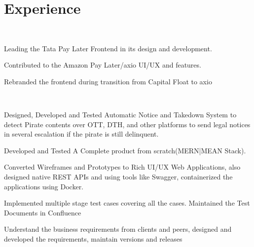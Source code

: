 \documentclass[]{deedy-resume-openfont}
\begin{document}
\hfill
\begin{minipage}[t]{0.66\textwidth} 


\section{Experience}

\sectionsep\\
\vspace{\topsep} %
\begin{tightemize}
\item Leading the Tata Pay Later Frontend in its design and development.
\item Contributed to the Amazon Pay Later/axio UI/UX and features.
\item Rebranded the frontend during transition from Capital Float to axio
\end{tightemize}
\sectionsep

\sectionsep\\
\vspace{\topsep} %
\begin{tightemize}
\item Designed, Developed and Tested Automatic Notice and Takedown System to detect Pirate contents over OTT, DTH, and other platforms to send legal notices in several escalation if the pirate is still delinquent.
\item Developed and Tested A Complete product from scratch(MERN|MEAN Stack).
\item Converted Wireframes and Prototypes to Rich UI/UX Web Applications, also designed native REST APIs and using tools like Swagger, containerized the applications using Docker. 
\item Implemented multiple stage test cases covering all the cases. Maintained the Test Documents in Confluence
\item Understand the business requirements from clients and peers, designed and developed the requirements, maintain versions and releases 
\end{tightemize}
\sectionsep



\end{minipage}
\end{document}
